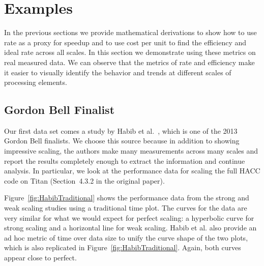 \documentclass{llncs}
\newcommand*{\scite}[1]{~\cite{#1}}
\newcommand{\etal}{et al.\xspace}
\begin{document}



\section{Examples}

\noindent
In the previous sections we provide mathematical derivations to show how
to use rate as a proxy for speedup and to use cost per unit to find the
efficiency and ideal rate across all scales. In this section we demonstrate
using these metrics on real measured data. We can observe that the metrics
of rate and efficiency make it easier to visually identify the behavior and
trends at different scales of processing elements.

\subsection{Gordon Bell Finalist}

\noindent
Our first data set comes a study by Habib \etal\scite{Habib2013}, which is
one of the 2013 Gordon Bell finalists. We choose this source because in
addition to showing impressive scaling, the authors make many measurements
across many scales and report the results completely enough to extract the
information and continue analysis. In particular, we look at the
performance data for scaling the full HACC code on Titan (Section~4.3.2 in
the original paper).

Figure~\ref{fig:HabibTraditional} shows the performance data from the
strong and weak scaling studies using a traditional time plot. The curves
for the data are very similar for what we would expect for perfect scaling:
a hyperbolic curve for strong scaling and a horizontal line for weak
scaling. Habib \etal also provide an ad hoc metric of time over data size
to unify the curve shape of the two plots, which is also replicated in
Figure~\ref{fig:HabibTraditional}. Again, both curves appear close to
perfect.
\end{document}
